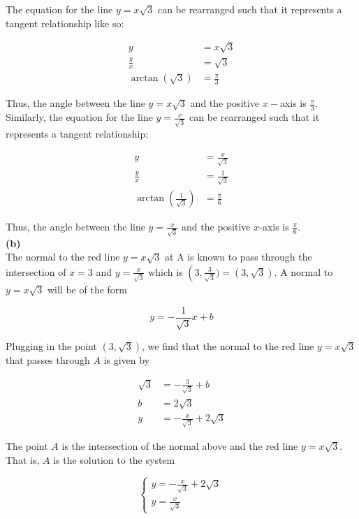 \documentclass{article}
\begin{document}
    The equation for the line $y=x\sqrt{3}$ can be rearranged such that it represents a tangent relationship like so:

    \begin{align*}
        y   &= x\sqrt{3} \\
        \frac{y}{x} &= \sqrt{3} \\
        \arctan(\sqrt{3})   &= \frac{\pi}{3}
    \end{align*}

    Thus, the angle between the line $y=x\sqrt{3}$ and the positive $x-$axis is $\frac{\pi}{3}$. Similarly, the equation for the line $y=\frac{x}{\sqrt{3}}$ can be rearranged such that it represents a tangent
    relationship:

    \begin{align*}
        y   &= \frac{x}{\sqrt{3}} \\
        \frac{y}{x} &= \frac{1}{\sqrt{3}} \\
        \arctan{\left(\frac{1}{\sqrt{3}}\right)}    &= \frac{\pi}{6}
    \end{align*}

    Thus, the angle between the line $y=\frac{x}{\sqrt{3}}$ and the positive $x$-axis is $\frac{\pi}{6}$. \\

    \textbf{(b)} \\
    The normal to the red line $y=x\sqrt{3}$ at A is known to pass through the intersection of $x=3$ and $y=\frac{x}{\sqrt{3}}$ which is $\left(3,\frac{3}{\sqrt{3}})=(3,\sqrt{3})$. A normal to $y=x\sqrt{3}$ will be of
    the form

    \[
        y = -\frac{1}{\sqrt{3}}x+b
    \]

    Plugging in the point $(3,\sqrt{3})$, we find that the normal to the red line $y=x\sqrt{3}$ that passes through $A$ is given by

    \begin{align*}
        \sqrt{3}    &= -\frac{3}{\sqrt{3}}+b \\
        b           &= 2\sqrt{3} \\
        y           &= -\frac{x}{\sqrt{3}}+2\sqrt{3}
    \end{align*}

    The point $A$ is the intersection of the normal above and the red line $y=x\sqrt{3}$. That is, $A$ is the solution to the system

    \[
        \begin{cases}
            y = -\frac{x}{\sqrt{3}}+2\sqrt{3} \\
            y = \frac{x}{\sqrt{3}}
        \end{cases}
    \]
\end{document}
